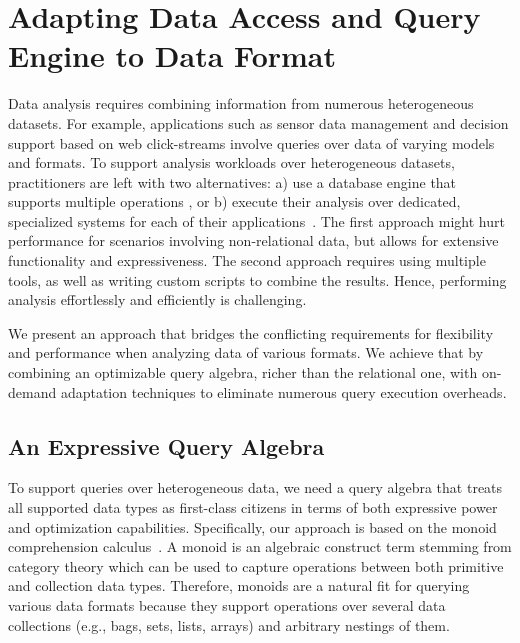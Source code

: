 \section{Adapting Data Access and Query Engine to Data Format}
\label{sec:proteus}

Data analysis requires combining information from numerous 
heterogeneous datasets. For example, applications such as sensor data 
management and decision support based on web click-streams involve 
queries over data of varying models and formats. 
To support analysis workloads over heterogeneous datasets, 
practitioners are left with two alternatives: 
a) use a database engine that supports multiple operations 
\cite{onesize_fitsall}, %
or b) execute their analysis over dedicated, specialized systems for each of their applications~\cite{xml_to_relational}. 
The first approach might hurt performance for scenarios involving 
non-relational data, but allows for extensive functionality and 
expressiveness. The second approach 
requires using multiple tools, as well as writing custom scripts to 
combine the results. Hence, performing analysis effortlessly and 
efficiently is challenging.

We present an approach that bridges the 
conflicting requirements for flexibility and performance when analyzing data of various formats. 
We achieve that by combining an optimizable query 
algebra, richer than the relational one, with on-demand adaptation 
techniques to eliminate numerous query execution overheads.

\subsection{An Expressive Query Algebra}
To support queries over heterogeneous data, we need a query algebra that 
treats all supported data types as first-class citizens in terms of 
both expressive power and optimization capabilities.
Specifically, our approach is based on the monoid comprehension 
calculus~\cite{monoids}. A monoid is an algebraic construct term 
stemming from category theory which can be used to capture operations between both
primitive and collection data types. Therefore, monoids are a natural
fit for querying various data formats because they support operations over several data 
collections (e.g., bags, sets, lists, arrays) and arbitrary nestings 
of them. 
%

